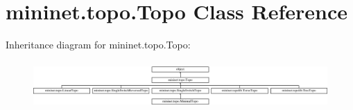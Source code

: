 \hypertarget{classmininet_1_1topo_1_1Topo}{\section{mininet.\-topo.\-Topo Class Reference}
\label{classmininet_1_1topo_1_1Topo}
}
Inheritance diagram for mininet.\-topo.\-Topo\-:\begin{figure}[H]
\begin{center}
\leavevmode
\includegraphics[height=1.828571cm]{classmininet_1_1topo_1_1Topo}
\end{center}
\end{figure}
